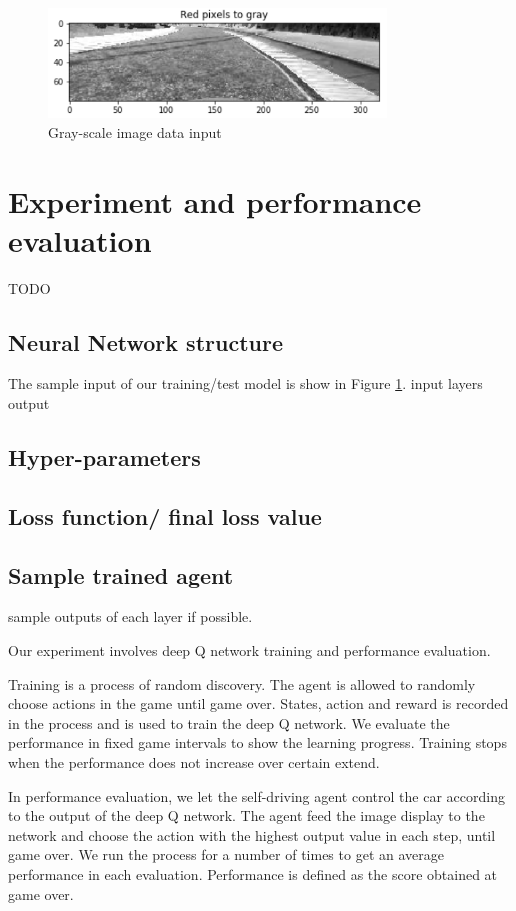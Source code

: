 \documentclass[a4paper]{article}
\begin{document}
\begin{figure}
    \centering
    \includegraphics[width=0.8\textwidth]{./figures/sample_gray.jpg}
    \caption{ Gray-scale image data input }
    \label{fig:sample_gray}
\end{figure}


\section{Experiment and performance evaluation}
TODO
\subsection{Neural Network structure}

The sample input of our training/test model is show in Figure \ref{fig:sample_gray}.
input layers output
\subsection{Hyper-parameters}
\subsection{Loss function/ final loss value}
\subsection{Sample trained agent}
sample outputs of each layer if possible.

Our experiment involves deep Q network training and performance evaluation. 

Training is a process of random discovery. The agent is allowed to randomly choose actions in the
game until game over. States, action and reward is recorded in the process and is used to train
the deep Q network. We evaluate the performance in fixed game intervals to show the learning
progress. Training stops when the performance does not increase over certain extend.

In performance evaluation, we let the self-driving agent control the car according to the output
of the deep Q network. The agent feed the image display to the network and choose the action with
the highest output value in each step, until game over. We run the process for a number of times
to get an average performance in each evaluation. Performance is defined as the score obtained at
game over.
\end{document}
